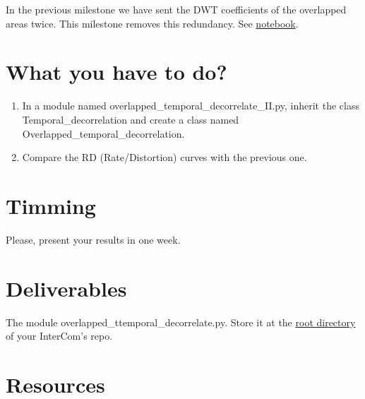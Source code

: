 In the previous milestone we have sent the DWT coefficients of the
overlapped areas twice. This milestone removes this redundancy. See
\href{https://github.com/Tecnologias-multimedia/intercom/blob/master/docs/overlapped_DWT_II.ipynb}{notebook}.

\section{What you have to do?}

\begin{enumerate}
\item In a module named overlapped\_temporal\_decorrelate\_II.py, inherit
  the class Temporal\_decorrelation and create a class named
  Overlapped\_temporal\_decorrelation.
\item Compare the RD (Rate/Distortion) curves with the previous one.
\end{enumerate}

\section{Timming}

Please, present your results in one week.

\section{Deliverables}

The module overlapped\_ttemporal\_decorrelate.py. Store it at the
\href{https://github.com/Tecnologias-multimedia/intercom}{root
  directory} of your InterCom's repo.

\section{Resources}



